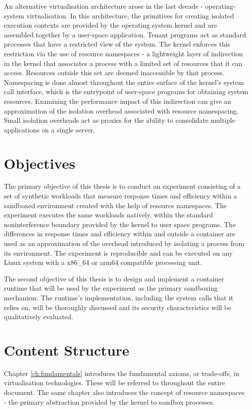 An alternative virtualisation architecture arose in the last decade - operating-system virtualisation. 
In this architecture, the primitives for creating isolated execution contexts are provided 
by the operating system kernel and are assembled together by a user-space application.
Tenant programs act as standard processes that have a restricted view of the system.
The kernel enforces this restriction via the use of resource namespaces - a lightweight 
layer of indirection in the kernel that associates a process with a limited set of resources 
that it can access. Resources outside this set are deemed inaccessible by that process. 
Namespacing is done almost throughout the entire surface of the kernel's system call interface, which 
is the entrypoint of user-space programs for obtaining system resources. Examining the performance impact 
of this indirection can give an approximation of the isolation overhead associated with resource namespacing. 
Small isolation overheads act as proxies for the ability to consolidate multiple applications on a single server.

\section{Objectives}
The primary objective of this thesis is to conduct an experiment consisting of a set of 
synthetic workloads that measure response times and efficiency within a sandboxed environment created with the help of resource namespaces.
The experiment executes the same workloads natively, within the standard noninterference boundary 
provided by the kernel to user space programs. The differences in response times and efficiency 
within and outside a container are used as an approximation of the overhead introduced 
by isolating a process from its environment. The experiment is reproducible and can be executed 
on any Linux system with a x86\_64 or arm64 compatible processing unit.

The second objective of this thesis is to design and implement a container runtime 
that will be used by the experiment as the primary sandboxing mechanism. The runtime's 
implementation, including the system calls that it relies on, will be thoroughly discussed and its security characteristics
will be qualitatively evaluated. 

\section{Content Structure}
Chapter \ref{ch:fundamentals} introduces the fundamental axioms, or trade-offs, in virtualisation technologies.
These will be referred to throughout the entire document. 
The same chapter also introduces the concept of resource namespaces - the primary abstraction 
provided by the kernel to sandbox processes.

